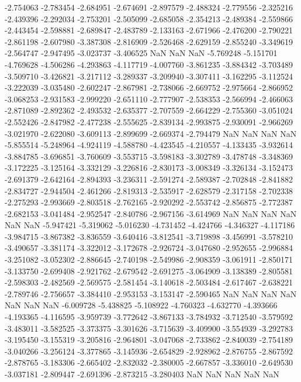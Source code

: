 -2.754063
-2.783454
-2.684951
-2.674691
-2.897579
-2.488324
-2.779556
-2.325216
-2.439396
-2.292034
-2.753201
-2.505099
-2.685058
-2.354213
-2.489384
-2.559866
-2.443454
-2.598881
-2.689847
-2.483789
-2.133163
-2.671966
-2.476200
-2.790221
-2.861198
-2.607980
-3.387308
-2.816909
-2.526468
-2.629159
-2.855240
-3.349619
-2.564747
-2.947495
-3.023737
-3.406525
NaN
NaN
NaN
-5.769248
-5.151701
-4.769628
-4.506286
-4.293863
-4.117719
-4.007760
-3.861235
-3.884342
-3.703489
-3.509710
-3.426821
-3.217112
-3.289337
-3.209940
-3.307411
-3.162295
-3.112524
-3.222039
-3.035480
-2.602247
-2.867981
-2.738066
-2.669752
-2.975664
-2.866952
-3.068253
-2.931583
-2.999220
-2.651110
-2.777907
-2.538353
-2.566994
-2.466063
-2.871089
-2.892362
-2.493532
-2.635377
-2.707559
-2.664229
-2.755360
-3.051024
-2.552426
-2.847982
-2.477238
-2.555625
-2.839134
-2.993875
-2.930091
-2.966269
-3.021970
-2.622080
-3.609113
-2.899699
-2.669374
-2.794479
NaN
NaN
NaN
NaN
-5.855514
-5.248964
-4.924119
-4.588780
-4.423545
-4.210557
-4.133435
-3.932614
-3.884785
-3.696851
-3.760609
-3.553715
-3.598183
-3.302789
-3.478748
-3.348369
-3.172225
-3.125164
-3.332129
-3.226816
-2.830173
-3.008349
-3.326134
-3.152473
-2.691379
-2.642164
-2.894393
-3.236311
-2.591274
-2.589387
-2.702848
-2.841882
-2.834727
-2.944504
-2.461266
-2.819313
-2.535917
-2.628579
-2.317158
-2.702338
-2.275293
-2.993669
-2.803518
-2.762165
-2.920292
-2.553742
-2.856875
-2.772387
-2.682153
-3.041484
-2.952547
-2.840786
-2.967156
-3.614969
NaN
NaN
NaN
NaN
NaN
NaN
-5.947421
-5.319062
-5.016230
-4.731452
-4.424766
-4.346327
-4.117186
-3.984715
-3.867382
-3.836559
-3.640416
-3.812541
-3.719898
-3.456991
-3.578210
-3.490657
-3.381174
-3.322012
-3.172678
-2.926724
-3.047680
-2.952655
-2.996884
-3.251082
-3.052302
-2.886645
-2.740198
-2.549986
-2.908359
-3.061911
-2.850171
-3.133750
-2.699408
-2.921762
-2.679542
-2.691275
-3.064909
-3.138389
-2.805581
-2.598303
-2.482569
-2.569575
-2.581454
-3.140618
-2.503484
-2.617467
-2.638221
-2.789746
-2.756657
-3.384410
-2.953153
-3.153147
-2.590465
NaN
NaN
NaN
NaN
NaN
NaN
NaN
-6.009728
-5.438825
-5.108922
-4.760323
-4.632770
-4.393666
-4.193365
-4.116595
-3.959739
-3.772642
-3.867133
-3.784932
-3.712540
-3.579592
-3.483011
-3.582525
-3.373375
-3.301626
-3.715639
-3.409900
-3.554939
-3.292783
-3.195450
-3.155319
-3.205816
-2.964801
-3.047068
-2.733862
-2.840039
-2.754189
-3.040266
-3.256124
-3.377865
-3.145936
-2.654829
-2.928962
-2.876755
-2.867592
-2.878765
-3.183306
-2.665402
-2.832032
-2.380005
-2.667857
-3.336010
-2.649530
-3.037181
-2.809447
-2.691396
-2.873215
-3.280403
NaN
NaN
NaN
NaN
NaN
